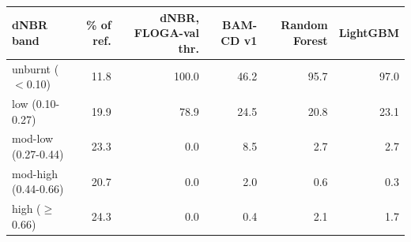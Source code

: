 \begin{tabular}{lrrrrr}
\toprule
dNBR band & \% of ref. & dNBR, FLOGA-val thr. & BAM-CD v1 & Random Forest & LightGBM \\
\midrule
unburnt ($<$0.10) & 11.8 & 100.0 & 46.2 & 95.7 & 97.0 \\
low (0.10-0.27) & 19.9 & 78.9 & 24.5 & 20.8 & 23.1 \\
mod-low (0.27-0.44) & 23.3 & 0.0 & 8.5 & 2.7 & 2.7 \\
mod-high (0.44-0.66) & 20.7 & 0.0 & 2.0 & 0.6 & 0.3 \\
high ($\geq$0.66) & 24.3 & 0.0 & 0.4 & 2.1 & 1.7 \\
\bottomrule
\end{tabular}
